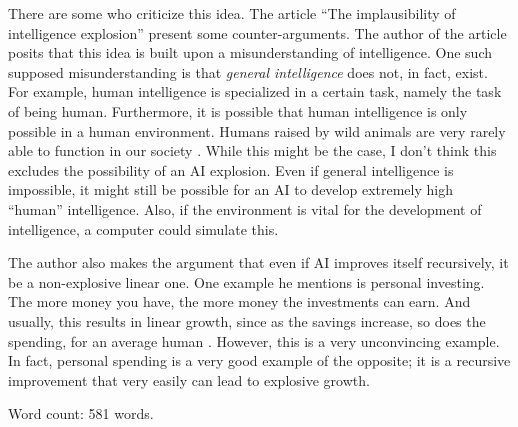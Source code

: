 \documentclass[12pt]{article}
\begin{document}
{There are some who criticize this idea. The article ``The implausibility of intelligence explosion'' present some counter-arguments. The author of the article posits that this idea is built upon a misunderstanding of intelligence. One such supposed misunderstanding is that \textit{general intelligence} does not, in fact, exist. For example, human intelligence is specialized in a certain task, namely the task of being human. Furthermore, it is possible that human intelligence is only possible in a human environment. Humans raised by wild animals are very rarely able to function in our society \cite{IntelligenceExplosion}. While this might be the case, I don't think this excludes the possibility of an AI explosion. Even if general intelligence is impossible, it might still be possible for an AI to develop extremely high ``human'' intelligence. Also, if the environment is vital for the development of intelligence, a computer could simulate this.

The author also makes the argument that even if AI improves itself recursively, it be a non-explosive linear one. One example he mentions is personal investing. The more money you have, the more money the investments can earn. And usually, this results in linear growth, since as the savings increase, so does the spending, for an average human \cite{IntelligenceExplosion}. However, this is a very unconvincing example. In fact, personal spending is a very good example of the opposite; it is a recursive improvement that very easily can lead to explosive growth.

Word count: 581 words.
}

\printbibliography[title={References - Joar}, category=joar]
\end{document}
